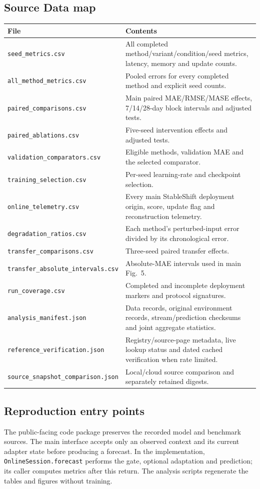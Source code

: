 \documentclass[11pt,a4paper]{article}
\begin{document}
\subsection{Source Data map}
\begin{longtable}{p{6.4cm}p{9.8cm}}
\toprule File & Contents\\\midrule\endhead
\texttt{seed\_metrics.csv} & All completed method/variant/condition/seed metrics, latency, memory and update counts.\\
\texttt{all\_method\_metrics.csv} & Pooled errors for every completed method and explicit seed counts.\\
\texttt{paired\_comparisons.csv} & Main paired MAE/RMSE/MASE effects, 7/14/28-day block intervals and adjusted tests.\\
\texttt{paired\_ablations.csv} & Five-seed intervention effects and adjusted tests.\\
\texttt{validation\_comparators.csv} & Eligible methods, validation MAE and the selected comparator.\\
\texttt{training\_selection.csv} & Per-seed learning-rate and checkpoint selection.\\
\texttt{online\_telemetry.csv} & Every main StableShift deployment origin, score, update flag and reconstruction telemetry.\\
\texttt{degradation\_ratios.csv} & Each method's perturbed-input error divided by its chronological error.\\
\texttt{transfer\_comparisons.csv} & Three-seed paired transfer effects.\\
\texttt{transfer\_absolute\_intervals.csv} & Absolute-MAE intervals used in main Fig.~5.\\
\texttt{run\_coverage.csv} & Completed and incomplete deployment markers and protocol signatures.\\
\texttt{analysis\_manifest.json} & Data records, original environment records, stream/prediction checksums and joint aggregate statistics.\\
\texttt{reference\_verification.json} & Registry/source-page metadata, live lookup status and dated cached verification when rate limited.\\
\texttt{source\_snapshot\_comparison.json} & Local/cloud source comparison and separately retained digests.\\
\bottomrule
\end{longtable}

\subsection{Reproduction entry points}
The public-facing code package preserves the recorded model and benchmark sources. The main interface accepts only an observed context and its current adapter state before producing a forecast. In the implementation, \texttt{OnlineSession.forecast} performs the gate, optional adaptation and prediction; its caller computes metrics after this return. The analysis scripts regenerate the tables and figures without training.
\end{document}
